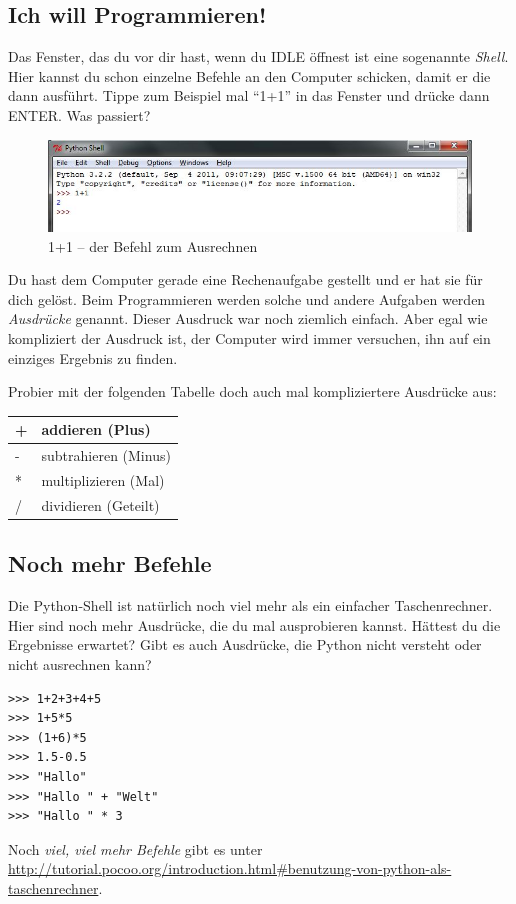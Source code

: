 	\subsection*{Ich will Programmieren!}
	Das Fenster, das du vor dir hast, wenn du IDLE öffnest ist eine sogenannte \emph{Shell}. Hier kannst du schon einzelne Befehle an den Computer schicken, damit er die dann ausführt. Tippe zum Beispiel mal \enquote{1+1} in das Fenster und drücke dann ENTER. Was passiert?
	
	\begin{figure}[htbp]
		\centering
		\includegraphics[width=1\textwidth]{img/1plus1.jpg}
		\caption{1+1 – der Befehl zum Ausrechnen}
		\label{1plus1}
	\end{figure}
	
	Du hast dem Computer gerade eine Rechenaufgabe gestellt und er hat sie für dich gelöst. Beim Programmieren werden solche und andere Aufgaben werden \emph{Ausdrücke} genannt. Dieser Ausdruck war noch ziemlich einfach. Aber egal wie kompliziert der Ausdruck ist, der Computer wird immer versuchen, ihn auf ein einziges Ergebnis zu finden. 
	
	Probier mit der folgenden Tabelle doch auch mal kompliziertere Ausdrücke aus:
	\begin{table}[htbp]
		\centering
		\normalsize
		\begin{tabular}{|l|l|}
			\hline
				+ & 	addieren (Plus)	\\
			\hline
				- & 	subtrahieren (Minus)\\
			\hline
				* & 	multiplizieren (Mal)\\
			\hline
				/ & 	dividieren (Geteilt)\\
			\hline
		\end{tabular}
	\end{table}
	
	\subsection*{Noch mehr Befehle}
	Die Python-Shell ist natürlich noch viel mehr als ein einfacher Taschenrechner. Hier sind noch mehr Ausdrücke, die du mal ausprobieren kannst. Hättest du die Ergebnisse erwartet? Gibt es auch Ausdrücke, die Python nicht versteht oder nicht ausrechnen kann?
	
	\begin{lstlisting}
>>> 1+2+3+4+5
>>> 1+5*5
>>> (1+6)*5
>>> 1.5-0.5
>>> "Hallo"
>>> "Hallo " + "Welt"
>>> "Hallo " * 3
	\end{lstlisting}
	
	Noch \emph{viel, viel mehr Befehle} gibt es unter \url{http://tutorial.pocoo.org/introduction.html#benutzung-von-python-als-taschenrechner}.
	
